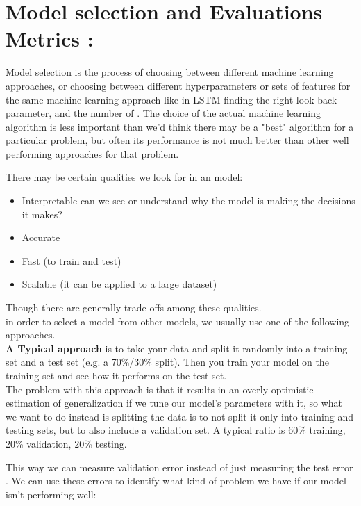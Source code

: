
\chapter{Model selection and Evaluations Metrics :}\label{descriptors}
Model selection is the process of choosing between different machine learning approaches,  or choosing between different hyperparameters or sets of features for the same machine learning approach  like in LSTM  finding the right look back parameter, and the number of .
The choice of the actual machine learning algorithm is less important than we'd think  there may be a "best" algorithm for a particular problem, but often its performance is not much better than other well performing approaches for that problem.


There may be certain qualities we look for in an model:
\begin{itemize}
\item Interpretable   can we see or understand why the model is making the decisions it makes?
\item Accurate
\item Fast (to train and test)
\item Scalable (it can be applied to a large dataset)
\end{itemize}
Though there are generally trade offs among these qualities.\\in order to select a model from other models, we usually use one of the following approaches.\\\textbf{A Typical approach } is to take your data and split it randomly into a training set and a test set (e.g. a 70\%/30\% split). Then you train your model on the training set and see how it performs on the test set.\\The problem with this approach is that it results in an overly optimistic estimation of generalization if we tune our model's parameters with it,  so what we want to do instead is splitting the data is to not split it only into training and testing sets, but to also include a validation set. A typical ratio is 60\% training, 20\% validation, 20\% testing.

This way we can measure validation error instead of just measuring the test error .
We can use these errors   to identify what kind of problem we have if our model isn't performing well:

